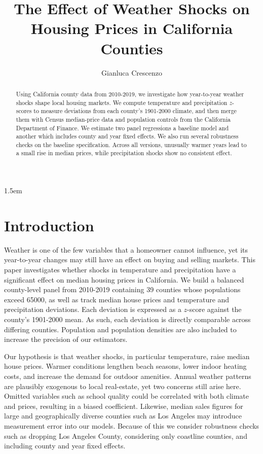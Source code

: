 \documentclass[12pt,reqno]{amsart}
\theoremstyle{definition}
\begin{document}
\parindent1.5em
\setlength\parskip{.1em}
\thispagestyle{empty}
\title{The Effect of Weather Shocks on Housing Prices in California Counties}
\author[Gianluca Crescenzo]{Gianluca Crescenzo}

\begin{abstract}
    Using California county data from 2010-2019, we investigate how year-to-year weather shocks shape local housing markets. We compute temperature and precipitation $z$-scores to measure deviations from each county's 1901-2000 climate, and then merge them with Census median-price data and population controls from the California Department of Finance. We estimate two panel regressions \textemdash a baseline model and another which includes county and year fixed effects. We also run several robustness checks on the baseline specification. Across all versions, unusually warmer years lead to a small rise in median prices, while precipitation shocks show no consistent effect.
\end{abstract}

\maketitle
\section{Introduction}
    Weather is one of the few variables that a homeowner cannot influence, yet its year-to-year changes may still have an effect on buying and selling markets. This paper investigates whether shocks in temperature and precipitation have a significant effect on median housing prices in California. We build a balanced county-level panel from 2010-2019 containing 39 counties whose populations exceed 65000, as well as track median house prices and temperature and precipitation deviations. Each deviation is expressed as a $z$-score against the county's 1901-2000 mean. As such, each deviation is directly comparable across differing counties. Population and population densities are also included to increase the precision of our estimators.

    Our hypothesis is that weather shocks, in particular temperature, raise median house prices. Warmer conditions lengthen beach seasons, lower indoor heating costs, and increase the demand for outdoor amenities. Annual weather patterns are plausibly exogenous to local real-estate, yet two concerns still arise here. Omitted variables such as school quality could be correlated with both climate and prices, resulting in a biased coefficient. Likewise, median sales figures for large and geographically diverse counties such as Los Angeles may introduce measurement error into our models. Because of this we consider robustness checks such as dropping Los Angeles County, considering only coastline counties, and including county and year fixed effects. 
\end{document}
